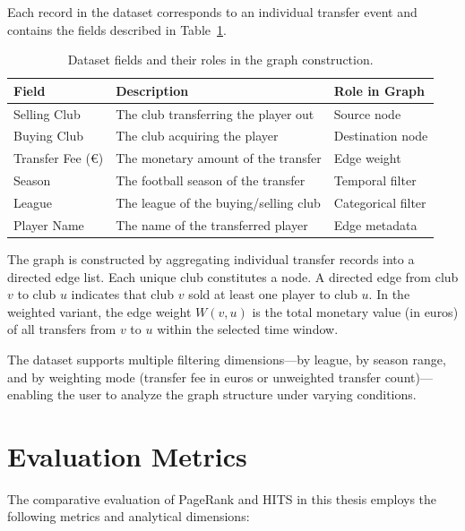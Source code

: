 Each record in the dataset corresponds to an individual transfer event and contains the fields described in Table~\ref{tab:dataset_fields}.

\begin{table}[htbp]
\centering
\caption{Dataset fields and their roles in the graph construction.}
\label{tab:dataset_fields}
\begin{tabular}{l l l}
\hline
\textbf{Field} & \textbf{Description} & \textbf{Role in Graph} \\
\hline
Selling Club   & The club transferring the player out     & Source node       \\
Buying Club    & The club acquiring the player             & Destination node  \\
Transfer Fee (\euro) & The monetary amount of the transfer & Edge weight       \\
Season         & The football season of the transfer       & Temporal filter   \\
League         & The league of the buying/selling club     & Categorical filter\\
Player Name    & The name of the transferred player        & Edge metadata     \\
\hline
\end{tabular}
\end{table}

The graph is constructed by aggregating individual transfer records into a directed edge list. Each unique club constitutes a node. A directed edge from club $v$ to club $u$ indicates that club $v$ sold at least one player to club $u$. In the weighted variant, the edge weight $W(v, u)$ is the total monetary value (in euros) of all transfers from $v$ to $u$ within the selected time window.

The dataset supports multiple filtering dimensions---by league, by season range, and by weighting mode (transfer fee in euros or unweighted transfer count)---enabling the user to analyze the graph structure under varying conditions.


\section{Evaluation Metrics}
\label{sec:eval_metrics_bg}

The comparative evaluation of PageRank and HITS in this thesis employs the following metrics and analytical dimensions:

